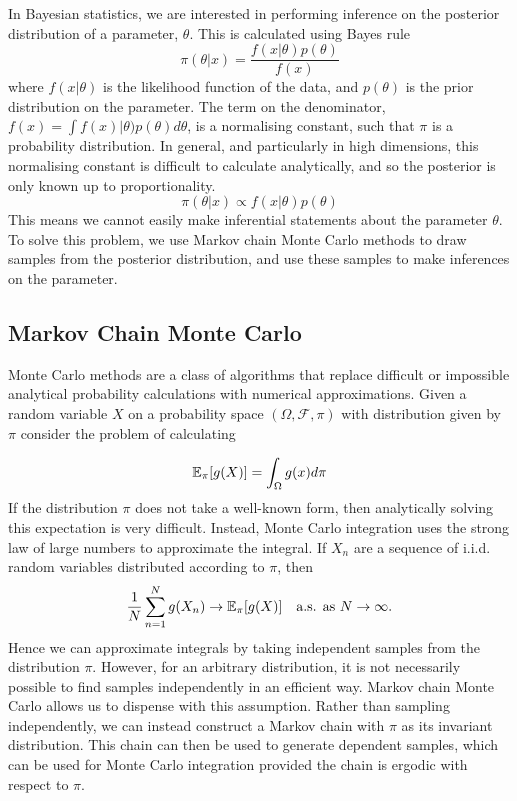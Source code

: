 In Bayesian statistics, we are interested in performing inference on the posterior distribution of a parameter, $\theta$.  This is calculated using Bayes rule
$$
\pi(\theta | x) = \frac{f(x | \theta) p(\theta)}{f(x)}
$$
where $f(x|\theta)$ is the likelihood function of the data, and $p(\theta)$ is the prior distribution on the parameter.  The term on the denominator, $f(x)=\int f(x)|\theta) p(\theta) d\theta$, is a normalising constant, such that $\pi$ is a probability distribution.  In general, and particularly in high dimensions, this normalising constant is difficult to calculate analytically, and so the posterior is only known up to proportionality.
$$
\pi(\theta | x) \propto f(x | \theta) p(\theta)
$$
This means we cannot easily make inferential statements about the parameter $\theta$.  To solve this problem, we use Markov chain Monte Carlo methods to draw samples from the posterior distribution, and use these samples to make inferences on the parameter.

\subsection{Markov Chain Monte Carlo}
Monte Carlo methods are a class of algorithms that replace difficult or impossible analytical probability calculations with numerical approximations.  Given a random variable $X$ on a probability space $(\Omega,\mathcal{F}, \pi)$ with distribution given by $\pi$ consider the problem of calculating

$$
\mathbb{E}_\pi[g(X)] = \int_\Omega g(x) d \pi
$$
If the distribution $\pi$ does not take a well-known form, then analytically solving this expectation is very difficult.  Instead, Monte Carlo integration uses the strong law of large numbers to approximate the integral.  If $X_n$ are a sequence of i.i.d. random variables distributed according to $\pi$, then
$$
\frac{1}{N} \sum_{n=1}^N g(X_n) \to \mathbb{E}_\pi[g(X)] \quad \text{a.s. as $N \to \infty$.}
$$
Hence we can approximate integrals by taking independent samples from the distribution $\pi$.  However, for an arbitrary distribution, it is not necessarily possible to find samples independently in an efficient way.  Markov chain Monte Carlo allows us to dispense with this assumption.  Rather than sampling independently, we can instead construct a Markov chain with $\pi$ as its invariant distribution.  This chain can then be used to generate dependent samples, which can be used for Monte Carlo integration provided the chain is ergodic with respect to $\pi$.

